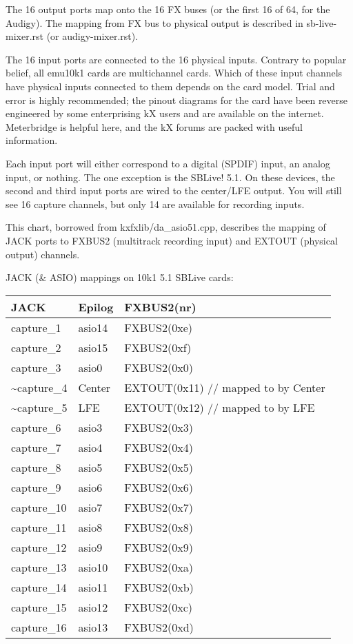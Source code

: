 \documentclass[a4paper,8pt,english]{sphinxmanual}
\begin{document}
The 16 output ports map onto the 16 FX buses (or the first 16 of 64, for the
Audigy).  The mapping from FX bus to physical output is described in
sb-live-mixer.rst (or audigy-mixer.rst).

The 16 input ports are connected to the 16 physical inputs.  Contrary to
popular belief, all emu10k1 cards are multichannel cards.  Which of these
input channels have physical inputs connected to them depends on the card
model.  Trial and error is highly recommended; the pinout diagrams
for the card have been reverse engineered by some enterprising kX users and are
available on the internet.  Meterbridge is helpful here, and the kX forums are
packed with useful information.

Each input port will either correspond to a digital (SPDIF) input, an analog
input, or nothing.  The one exception is the SBLive! 5.1.  On these devices,
the second and third input ports are wired to the center/LFE output.  You will
still see 16 capture channels, but only 14 are available for recording inputs.

This chart, borrowed from kxfxlib/da\_asio51.cpp, describes the mapping of JACK
ports to FXBUS2 (multitrack recording input) and EXTOUT (physical output)
channels.

JACK (\& ASIO) mappings on 10k1 5.1 SBLive cards:

\begin{tabulary}{\linewidth}{|L|L|L|}
\hline
\textsf{\relax 
JACK
} & \textsf{\relax 
Epilog
} & \textsf{\relax 
FXBUS2(nr)
}\\
\hline
capture\_1
 & 
asio14
 & 
FXBUS2(0xe)
\\
\hline
capture\_2
 & 
asio15
 & 
FXBUS2(0xf)
\\
\hline
capture\_3
 & 
asio0
 & 
FXBUS2(0x0)
\\
\hline
\textasciitilde{}capture\_4
 & 
Center
 & 
EXTOUT(0x11)    // mapped to by Center
\\
\hline
\textasciitilde{}capture\_5
 & 
LFE
 & 
EXTOUT(0x12)    // mapped to by LFE
\\
\hline
capture\_6
 & 
asio3
 & 
FXBUS2(0x3)
\\
\hline
capture\_7
 & 
asio4
 & 
FXBUS2(0x4)
\\
\hline
capture\_8
 & 
asio5
 & 
FXBUS2(0x5)
\\
\hline
capture\_9
 & 
asio6
 & 
FXBUS2(0x6)
\\
\hline
capture\_10
 & 
asio7
 & 
FXBUS2(0x7)
\\
\hline
capture\_11
 & 
asio8
 & 
FXBUS2(0x8)
\\
\hline
capture\_12
 & 
asio9
 & 
FXBUS2(0x9)
\\
\hline
capture\_13
 & 
asio10
 & 
FXBUS2(0xa)
\\
\hline
capture\_14
 & 
asio11
 & 
FXBUS2(0xb)
\\
\hline
capture\_15
 & 
asio12
 & 
FXBUS2(0xc)
\\
\hline
capture\_16
 & 
asio13
 & 
FXBUS2(0xd)
\\
\hline\end{tabulary}
\end{document}
